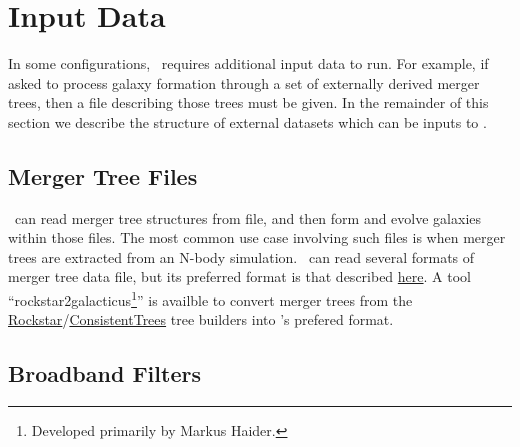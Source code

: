 \chapter{Input Data}

In some configurations, \glc\ requires additional input data to run. For example, if asked to process galaxy formation through a set of externally derived merger trees, then a file describing those trees must be given. In the remainder of this section we describe the structure of external datasets which can be inputs to \glc.

\section{Merger Tree Files}

\glc\ can read merger tree structures from file, and then form and evolve galaxies within those files. The most common use case involving such files is when merger trees are extracted from an N-body simulation. \glc\ can read several formats of merger tree data file, but its preferred format is that described \href{https://github.com/galacticusorg/galacticus/wiki/Merger-Tree-File-Format}{here}. A tool ``{\normalfont \ttfamily rockstar2galacticus}\footnote{Developed primarily by Markus Haider.}'' is availble to convert merger trees from the \href{https://bitbucket.org/gfcstanford/rockstar}{\normalfont \ttfamily Rockstar}/\href{https://bitbucket.org/pbehroozi/consistent-trees}{\normalfont \ttfamily ConsistentTrees} tree builders into \glc's prefered format.

\section{Broadband Filters}

